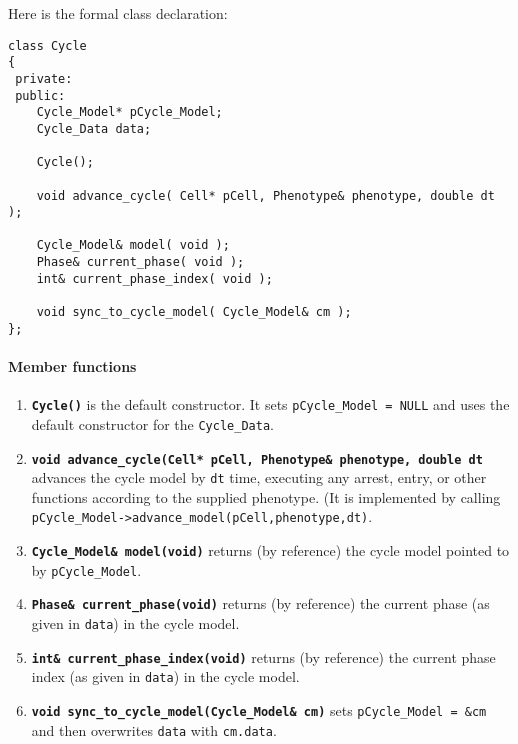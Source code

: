 \documentclass[12pt]{article}
\renewcommand{\v}{\verb}
\newcommand{\smallcode}[1]{\textbf{\texttt{#1}}}
\newcommand{\blue}[1]{\textcolor{blue}{#1}}
\newcommand{\DONE}{}%
\begin{document}
Here is the formal class declaration: 

\begin{verbatim}
class Cycle
{
 private:
 public:
    Cycle_Model* pCycle_Model; 
    Cycle_Data data; 
    
    Cycle();     
    
    void advance_cycle( Cell* pCell, Phenotype& phenotype, double dt );      
    
    Cycle_Model& model( void );      
    Phase& current_phase( void );      
    int& current_phase_index( void );      
    
    void sync_to_cycle_model( Cycle_Model& cm );      
};
\end{verbatim}

\paragraph{Member functions}
\begin{enumerate}
\item 
\smallcode{Cycle()} is the default constructor. It sets 
\v|pCycle_Model = NULL| and uses the default constructor for 
the \v|Cycle_Data|. 

\item 
\smallcode{void advance\_cycle(Cell* pCell, Phenotype\& phenotype, double dt } advances the cycle model 
by \v|dt| time, executing any arrest, entry, or other functions according to 
the supplied phenotype. (It is implemented by calling 
\v|pCycle_Model->advance_model(pCell,phenotype,dt)|. 

\item 
\smallcode{Cycle\_Model\& model(void)} returns (by reference) the cycle model pointed to 
by \hfill\break \v|pCycle_Model|. 

\item 
\smallcode{Phase\& current\_phase(void)} returns (by reference) the current phase (as given in \v|data|) 
in the cycle model. 

\item 
\smallcode{int\& current\_phase\_index(void)} returns (by reference) the current phase index (as 
given in \v|data|) in the cycle model. 

\item 
\smallcode{void sync\_to\_cycle\_model(Cycle\_Model\& cm)} sets \v|pCycle_Model = &cm| and then 
overwrites \v|data| with \v|cm.data|. 
\end{enumerate}

\end{document}
